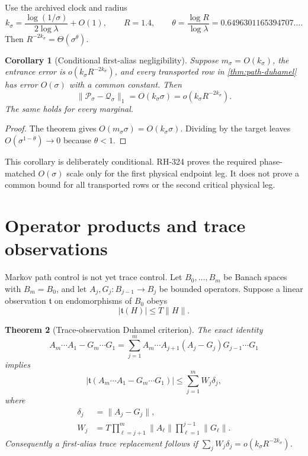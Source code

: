 \documentclass[11pt]{article}
\newtheorem{theorem}{Theorem}[section]
\newtheorem{corollary}[theorem]{Corollary}
\theoremstyle{remark}
\newcommand{\cP}{\mathcal P}
\newcommand{\cQ}{\mathcal Q}
\begin{document}
Use the archived clock and radius
\begin{equation}
 k_\sigma=\frac{\log(1/\sigma)}{2\log\lambda}+O(1),
 \qquad R=1.4,
 \qquad
 \theta=\frac{\log R}{\log\lambda}
 =0.6496301165394707\ldots .
 \label{eq:clock}
\end{equation}
Then $R^{-2k_\sigma}=\Theta(\sigma^\theta)$.

\begin{corollary}[Conditional first-alias negligibility]
\label{cor:markov-clock}
Suppose $m_\sigma=O(k_\sigma)$, the entrance error is
$o(k_\sigma R^{-2k_\sigma})$, and every transported row in
\cref{thm:path-duhamel} has error $O(\sigma)$ with a common constant.  Then
\begin{equation}
 \|\cP_\sigma-\cQ_\sigma\|_1
 =O(k_\sigma\sigma)
 =o(k_\sigma R^{-2k_\sigma}).
 \label{eq:markov-negligible}
\end{equation}
The same holds for every marginal.
\end{corollary}

\begin{proof}
The theorem gives $O(m_\sigma\sigma)=O(k_\sigma\sigma)$.  Dividing by the
target leaves $O(\sigma^{1-\theta})\to0$ because $\theta<1$.
\end{proof}

This corollary is deliberately conditional.  RH-324 proves the required
phase-matched $O(\sigma)$ scale only for the first physical endpoint leg.
It does not prove a common bound for all transported rows or the second
critical physical leg.

\section{Operator products and trace observations}

Markov path control is not yet trace control.  Let $B_0,\ldots,B_m$ be
Banach spaces with $B_m=B_0$, and let $A_j,G_j:B_{j-1}\to B_j$ be bounded
operators.  Suppose a linear observation $\mathfrak t$ on endomorphisms of
$B_0$ obeys
\begin{equation}
 |\mathfrak t(H)|\le T\|H\|.
 \label{eq:observation-bound}
\end{equation}

\begin{theorem}[Trace-observation Duhamel criterion]
\label{thm:operator-duhamel}
The exact identity
\begin{equation}
 A_m\cdots A_1-G_m\cdots G_1
 =\sum_{j=1}^m
 A_m\cdots A_{j+1}(A_j-G_j)G_{j-1}\cdots G_1
 \label{eq:duhamel-identity}
\end{equation}
implies
\begin{equation}
 \left|\mathfrak t(A_m\cdots A_1-G_m\cdots G_1)\right|
 \le\sum_{j=1}^m W_j\delta_j,
 \label{eq:operator-bound}
\end{equation}
where
\begin{align}
 \delta_j&=\|A_j-G_j\|,\nonumber\\
 W_j&=T
 \prod_{\ell=j+1}^m\|A_\ell\|
 \prod_{\ell=1}^{j-1}\|G_\ell\|.
 \label{eq:weights}
\end{align}
Consequently a first-alias trace replacement follows if
$\sum_jW_j\delta_j=o(k_\sigma R^{-2k_\sigma})$.
\end{theorem}
\end{document}
